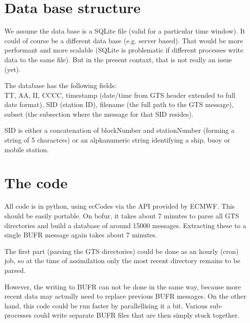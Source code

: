 \documentclass[10pt]{article}
\begin{document}
\section{Data base structure}
We assume the data base is a SQLite file (valid for a particular time window). It could of course be a different data base (e.g. server based). That would be more performant and more scalable (SQLite is problematic if different processes write data to the same file). But in the present contaxt, that is not really an issue (yet).

The database has the following fields:\\
TT, AA, II, CCCC, timestamp (date/time from GTS header extended to full date format), SID (station ID), filename (the full path to the GTS message), subset (the subsection where the message for that SID resides).

SID is either a concatenation of blockNumber and stationNumber (forming a string of 5 characters) or an alphanumeric string identifying a ship, buoy or mobile station.

\section{The code}
All code is in python, using ecCodes via the API provided by ECMWF. This should be easily portable.
On bofur, it takes about 7 minutes to parse all GTS directories and build a database of around 15000 messages. Extracting these to a single BUFR message again takes about 7 minutes.

The first part (parsing the GTS directories) could be done as an hourly (cron) job, so at the time of assimilation only the most recent directory remains to be parsed.

However, the writing to BUFR can not be done in the same way, because more recent data may actually need to replace previous BUFR messages. On the other hand, this code could be run faster by parallellising it a bit. Various sub-processes could write separate BUFR files that are then simply stuck together.
\end{document}
